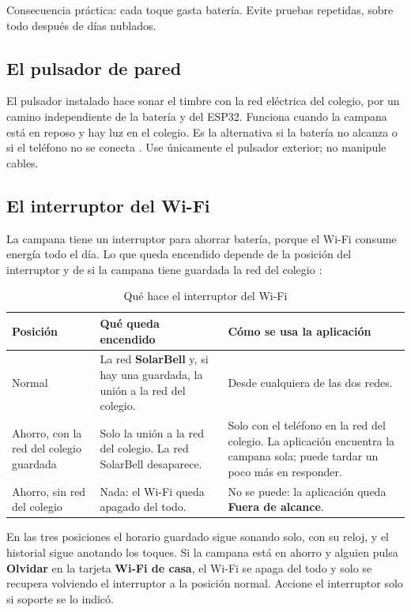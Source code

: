 \documentclass[a4paper,11pt]{article}
\newcommand{\boton}[1]{\textbf{#1}}
\begin{document}
Consecuencia práctica: cada toque gasta batería. Evite pruebas repetidas, sobre todo después de días nublados.

\subsection{El pulsador de pared}
El pulsador instalado hace sonar el timbre con la red eléctrica del colegio, por un camino independiente de la batería y del ESP32. Funciona cuando la campana está en reposo y hay luz en el colegio. Es la alternativa si la batería no alcanza o si el teléfono no se conecta \cite{informe}. Use únicamente el pulsador exterior; no manipule cables.

\subsection{El interruptor del Wi-Fi}
\label{sec:interruptor}
La campana tiene un interruptor para ahorrar batería, porque el Wi-Fi consume energía todo el día. Lo que queda encendido depende de la posición del interruptor y de si la campana tiene guardada la red del colegio \cite{firmware}:

\begin{table}[H]
\centering\small
\caption{Qué hace el interruptor del Wi-Fi}
\begin{tabularx}{\linewidth}{@{}P{4.4cm}YY@{}}
\toprule
\textbf{Posición} & \textbf{Qué queda encendido} & \textbf{Cómo se usa la aplicación} \\
\midrule
Normal & La red \textbf{SolarBell} y, si hay una guardada, la unión a la red del colegio. & Desde cualquiera de las dos redes. \\
Ahorro, con la red del colegio guardada & Solo la unión a la red del colegio. La red SolarBell desaparece. & Solo con el teléfono en la red del colegio. La aplicación encuentra la campana sola; puede tardar un poco más en responder. \\
Ahorro, sin red del colegio & Nada: el Wi-Fi queda apagado del todo. & No se puede: la aplicación queda \textbf{Fuera de alcance}. \\
\bottomrule
\end{tabularx}
\end{table}

En las tres posiciones el horario guardado sigue sonando solo, con su reloj, y el historial sigue anotando los toques. Si la campana está en ahorro y alguien pulsa \boton{Olvidar} en la tarjeta \textbf{Wi-Fi de casa}, el Wi-Fi se apaga del todo y solo se recupera volviendo el interruptor a la posición normal. Accione el interruptor solo si soporte se lo indicó.
\end{document}
